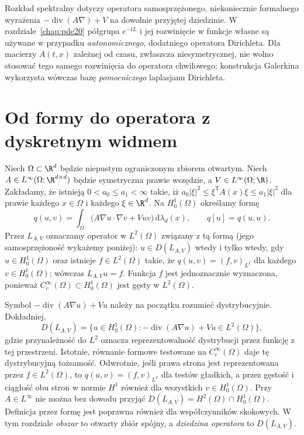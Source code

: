 \begin{uwaga}
\label{rem:pde-v43-spectral-heat}
Rozkład spektralny dotyczy operatora samosprzężonego,
niekoniecznie formalnego wyrażenia $-\operatorname{div}(A\nabla)+V$
na dowolnie przyjętej dziedzinie. W rozdziale~\ref{chap:pde20}
półgrupa $e^{-tL}$ i jej rozwinięcie w funkcje własne
są używane w przypadku \emph{autonomicznego}, dodatniego
operatora Dirichleta. Dla macierzy $A(t,x)$ zależnej od
czasu, zwłaszcza niesymetrycznej, nie wolno stosować
tego samego rozwinięcia do operatora chwilowego;
konstrukcja Galerkina wykorzysta wówczas bazę
\emph{pomocniczego} laplasjanu Dirichleta.
\end{uwaga}

\section{Od formy do operatora z dyskretnym widmem}
\label{sec:pde18-form}
\begin{definicja}
Niech $\Omega\subset\R^d$ będzie niepustym ograniczonym
zbiorem otwartym. Niech $A\in L^\infty(\Omega;\R^{d\times d})$
będzie symetryczna prawie wszędzie, a $V\in L^\infty(\Omega;\R)$.
Zakładamy, że istnieją $0<a_0\le a_1<\infty$ takie, iż
$ a_0|\xi|^2\le\xi^{\mathsf T}A(x)\xi\le a_1|\xi|^2$
dla prawie każdego $x\in\Omega$ i każdego $\xi\in\R^d$.
Na $H_0^1(\Omega)$ określamy formę
\begin{equation}\label{eq:pde18-form}
 q(u,v)=\int_\Omega \bigl(A\nabla u\cdot\nabla v+Vuv\bigr)
 \,\mathrm d\lambda_d(x),\qquad q[u]=q(u,u).
\end{equation}
Przez $L_{A,V}$ oznaczamy operator w $L^2(\Omega)$
związany z tą formą (jego samosprzężoność wykażemy poniżej): $u\in D(L_{A,V})$
wtedy i tylko wtedy, gdy $u\in H_0^1(\Omega)$ oraz istnieje
$f\in L^2(\Omega)$ takie, że $q(u,v)=(f,v)_{L^2}$
dla każdego $v\in H_0^1(\Omega)$; wówczas $L_{A,V}u=f$.
Funkcja $f$ jest jednoznacznie wyznaczona, ponieważ
$C_c^\infty(\Omega)\subset H_0^1(\Omega)$ jest gęsty w
$L^2(\Omega)$.
\end{definicja}

\begin{uwaga}
Symbol $-\operatorname{div}(A\nabla u)+Vu$ należy na początku
rozumieć dystrybucyjnie. Dokładniej,
\[
 D(L_{A,V})=\{u\in H_0^1(\Omega):
 -\operatorname{div}(A\nabla u)+Vu\in L^2(\Omega)\},
\]
gdzie przynależność do $L^2$ oznacza reprezentowalność
dystrybucji przez funkcję z tej przestrzeni.
Istotnie, równanie formowe testowane na $C_c^\infty(\Omega)$
daje tę dystrybucyjną tożsamość. Odwrotnie, jeśli prawa
strona jest reprezentowana przez $f\in L^2(\Omega)$,
to $q(u,v)=(f,v)_{L^2}$ dla testów gładkich,
a przez gęstość i ciągłość obu stron w normie $H^1$
również dla wszystkich $v\in H_0^1(\Omega)$.
Przy $A\in L^\infty$
nie można bez dowodu przyjąć $D(L_{A,V})=H^2(\Omega)\cap
H_0^1(\Omega)$. Definicja przez formę jest poprawna również dla
współczynników skokowych. W tym rozdziale \emph{obszar} to
otwarty zbiór spójny, a \emph{dziedzina operatora} to $D(L_{A,V})$.
\end{uwaga}

